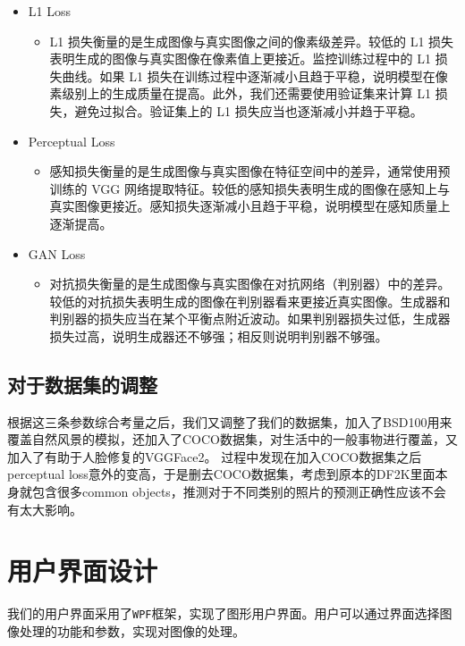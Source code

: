\documentclass[UTF8,openany]{ctexbook}
\begin{document}
\begin{itemize}
  \item L1 Loss
  \begin{itemize}
    \item L1 损失衡量的是生成图像与真实图像之间的像素级差异。较低的 L1 损失表明生成的图像与真实图像在像素值上更接近。监控训练过程中的 L1 损失曲线。如果 L1 损失在训练过程中逐渐减小且趋于平稳，说明模型在像素级别上的生成质量在提高。此外，我们还需要使用验证集来计算 L1 损失，避免过拟合。验证集上的 L1 损失应当也逐渐减小并趋于平稳。
  \end{itemize}
  \item Perceptual Loss
  \begin{itemize}
    \item 感知损失衡量的是生成图像与真实图像在特征空间中的差异，通常使用预训练的 VGG 网络提取特征。较低的感知损失表明生成的图像在感知上与真实图像更接近。感知损失逐渐减小且趋于平稳，说明模型在感知质量上逐渐提高。
  \end{itemize}
  \item GAN Loss
  \begin{itemize}
    \item 对抗损失衡量的是生成图像与真实图像在对抗网络（判别器）中的差异。较低的对抗损失表明生成的图像在判别器看来更接近真实图像。生成器和判别器的损失应当在某个平衡点附近波动。如果判别器损失过低，生成器损失过高，说明生成器还不够强；相反则说明判别器不够强。
  \end{itemize}
\end{itemize}

\subsection{对于数据集的调整}

根据这三条参数综合考量之后，我们又调整了我们的数据集，加入了BSD100用来覆盖自然风景的模拟，还加入了COCO数据集，对生活中的一般事物进行覆盖，又加入了有助于人脸修复的VGGFace2。
过程中发现在加入COCO数据集之后perceptual loss意外的变高，于是删去COCO数据集，考虑到原本的DF2K里面本身就包含很多common objects，推测对于不同类别的照片的预测正确性应该不会有太大影响。



\section{用户界面设计}

我们的用户界面采用了\texttt{WPF}框架，实现了图形用户界面。用户可以通过界面选择图像处理的功能和参数，实现对图像的处理。
\end{document}
